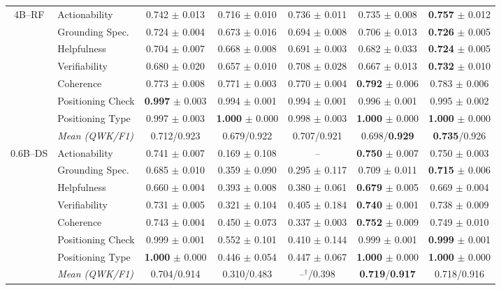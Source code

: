 \begin{table}[!tp]
{\begin{tabular*}{\textwidth}{@{\extracolsep{\fill}}clccccc@{}}
\multirow{8}{*}{4B--RF}
& Actionability & 0.742 $\pm$ 0.013 & 0.716 $\pm$ 0.010 & 0.736 $\pm$ 0.011 & 0.735 $\pm$ 0.008 & \textbf{0.757} $\pm$ 0.012 \\
& Grounding Spec. & 0.724 $\pm$ 0.004 & 0.673 $\pm$ 0.016 & 0.694 $\pm$ 0.008 & 0.706 $\pm$ 0.013 & \textbf{0.726} $\pm$ 0.005 \\
& Helpfulness & 0.704 $\pm$ 0.007 & 0.668 $\pm$ 0.008 & 0.691 $\pm$ 0.003 & 0.682 $\pm$ 0.033 & \textbf{0.724} $\pm$ 0.005 \\
& Verifiability & 0.680 $\pm$ 0.020 & 0.657 $\pm$ 0.010 & 0.708 $\pm$ 0.028 & 0.667 $\pm$ 0.013 & \textbf{0.732} $\pm$ 0.010 \\
\cmidrule(lr){2-7}
& Coherence & 0.773 $\pm$ 0.008 & 0.771 $\pm$ 0.003 & 0.770 $\pm$ 0.004 & \textbf{0.792} $\pm$ 0.006 & 0.783 $\pm$ 0.006 \\
& Positioning Check & \textbf{0.997} $\pm$ 0.003 & 0.994 $\pm$ 0.001 & 0.994 $\pm$ 0.001 & 0.996 $\pm$ 0.001 & 0.995 $\pm$ 0.002 \\
& Positioning Type & 0.997 $\pm$ 0.003 & \textbf{1.000} $\pm$ 0.000 & 0.998 $\pm$ 0.003 & \textbf{1.000} $\pm$ 0.000 & \textbf{1.000} $\pm$ 0.000 \\
& \textit{Mean (QWK/F1)} & 0.712/0.923 & 0.679/0.922 & 0.707/0.921 & 0.698/\textbf{0.929} & \textbf{0.735}/0.926 \\
\midrule

\multirow{8}{*}{0.6B--DS}
& Actionability & 0.741 $\pm$ 0.007 & 0.169 $\pm$ 0.108 & -- & \textbf{0.750} $\pm$ 0.007 & 0.750 $\pm$ 0.003 \\
& Grounding Spec. & 0.685 $\pm$ 0.010 & 0.359 $\pm$ 0.090 & 0.295 $\pm$ 0.117 & 0.709 $\pm$ 0.011 & \textbf{0.715} $\pm$ 0.006 \\
& Helpfulness & 0.660 $\pm$ 0.004 & 0.393 $\pm$ 0.008 & 0.380 $\pm$ 0.061 & \textbf{0.679} $\pm$ 0.005 & 0.669 $\pm$ 0.004 \\
& Verifiability & 0.731 $\pm$ 0.005 & 0.321 $\pm$ 0.104 & 0.405 $\pm$ 0.184 & \textbf{0.740} $\pm$ 0.001 & 0.738 $\pm$ 0.009 \\
\cmidrule(lr){2-7}
& Coherence & 0.743 $\pm$ 0.004 & 0.450 $\pm$ 0.073 & 0.337 $\pm$ 0.003 & \textbf{0.752} $\pm$ 0.009 & 0.749 $\pm$ 0.010 \\
& Positioning Check & 0.999 $\pm$ 0.001 & 0.552 $\pm$ 0.101 & 0.410 $\pm$ 0.144 & 0.999 $\pm$ 0.001 & \textbf{0.999} $\pm$ 0.001 \\
& Positioning Type & \textbf{1.000} $\pm$ 0.000 & 0.446 $\pm$ 0.054 & 0.447 $\pm$ 0.067 & \textbf{1.000} $\pm$ 0.000 & \textbf{1.000} $\pm$ 0.000 \\
& \textit{Mean (QWK/F1)} & 0.704/0.914 & 0.310/0.483 & --$^{\dagger}$/0.398 & \textbf{0.719}/\textbf{0.917} & 0.718/0.916 \\
\midrule


\end{tabular*}}
\end{table}
